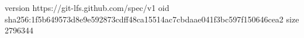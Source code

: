 version https://git-lfs.github.com/spec/v1
oid sha256:1f5b649573d8e9e592873cdff48ca15514ac7cbdaae041f3bc597f150646cea2
size 2796344
